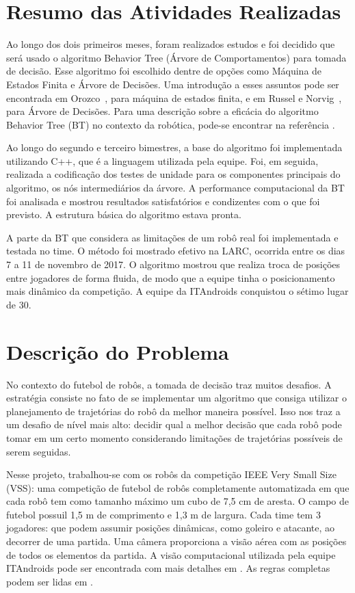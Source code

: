 \documentclass[a4paper,12pt]{article}
\begin{document}
\section{Resumo das Atividades Realizadas}
\label{secao:atividades_realizadas}

Ao longo dos dois primeiros meses, foram realizados estudos e foi decidido que será usado o algoritmo Behavior Tree (Árvore de Comportamentos) para tomada de decisão. Esse algoritmo foi escolhido dentre de opções como Máquina de Estados Finita e Árvore de Decisões. Uma introdução a esses assuntos pode ser encontrada em Orozco~\cite{orozcomaquinas}, para máquina de estados finita, e em Russel e Norvig~\cite{decision_tree}, para Árvore de Decisões. Para uma descrição sobre a eficácia do algoritmo Behavior Tree (BT) no contexto da robótica, pode-se encontrar na referência \cite{behavior_tree_robotics}.

Ao longo do segundo e terceiro bimestres, a base do algoritmo foi implementada utilizando C++, que é a linguagem utilizada pela equipe. Foi, em seguida, realizada a codificação dos testes de unidade para os componentes principais do algoritmo, os nós intermediários da árvore. A performance computacional da BT foi analisada e mostrou resultados satisfatórios e condizentes com o que foi previsto. A estrutura básica do algoritmo estava pronta.

A parte da BT que considera as limitações de um robô real foi implementada e testada no time. 
O método  foi mostrado efetivo na LARC, ocorrida entre os dias 7 a 11 de novembro de 2017. O algoritmo mostrou que realiza troca de posições entre jogadores de forma fluida, de modo que a equipe tinha o posicionamento mais dinâmico da competição. A equipe da ITAndroids conquistou o sétimo lugar de 30.

\section{Descrição do Problema}
\label{secao:enunciado_problema}

No contexto do futebol de robôs, a tomada de decisão traz muitos desafios. A estratégia consiste no fato de se implementar um algoritmo que consiga utilizar o planejamento de trajetórias do robô da melhor maneira possível. Isso nos traz a um desafio de nível mais alto: decidir qual a melhor decisão que cada robô pode tomar em um certo momento considerando limitações de trajetórias possíveis de serem seguidas.

Nesse projeto, trabalhou-se com os robôs da competição IEEE Very Small Size (VSS): uma competição de futebol de robôs completamente automatizada em que cada robô tem como tamanho máximo um cubo de 7,5 cm de aresta. O campo de futebol possuil 1,5 m de comprimento e 1,3 m de largura. Cada time tem 3 jogadores: que podem assumir posições dinâmicas, como goleiro e atacante, ao decorrer de uma partida. Uma câmera proporciona a visão aérea com as posições de todos os elementos da partida. A visão computacional utilizada pela equipe ITAndroids pode ser encontrada com mais detalhes em \cite{tasinaffo_ic}. As regras completas podem ser lidas em \cite{cbr2008}.
\end{document}
